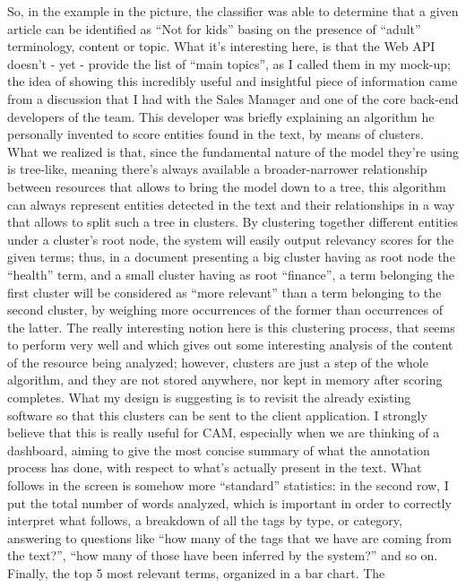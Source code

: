 \documentclass[12pt,svgnames]{memoir}
\begin{document}
So, in the example in the picture, the classifier was able to determine
that a given article can be identified as ``Not for kids'' basing on the
presence of ``adult'' terminology, content or topic. What it's
interesting here, is that the Web API doesn't - yet - provide the list
of ``main topics'', as I called them in my mock-up; the idea of showing
this incredibly useful and insightful piece of information came from a
discussion that I had with the Sales Manager and one of the core
back-end developers of the team. This developer was briefly explaining
an algorithm he personally invented to score entities found in the text,
by means of clusters. What we realized is that, since the fundamental
nature of the model they're using is tree-like, meaning there's always
available a broader-narrower relationship between resources that allows
to bring the model down to a tree, this algorithm can always represent
entities detected in the text and their relationships in a way that
allows to split such a tree in clusters. By clustering together
different entities under a cluster's root node, the system will easily
output relevancy scores for the given terms; thus, in a document
presenting a big cluster having as root node the ``health'' term, and a
small cluster having as root ``finance'', a term belonging the first
cluster will be considered as ``more relevant'' than a term belonging to
the second cluster, by weighing more occurrences of the former than
occurrences of the latter. The really interesting notion here is this
clustering process, that seems to perform very well and which gives out
some interesting analysis of the content of the resource being analyzed;
however, clusters are just a step of the whole algorithm, and they are
not stored anywhere, nor kept in memory after scoring completes. What my
design is suggesting is to revisit the already existing software so that
this clusters can be sent to the client application. I strongly believe
that this is really useful for CAM, especially when we are thinking of a
dashboard, aiming to give the most concise summary of what the
annotation process has done, with respect to what's actually present in
the text. What follows in the screen is somehow more ``standard''
statistics: in the second row, I put the total number of words analyzed,
which is important in order to correctly interpret what follows, a
breakdown of all the tags by type, or category, answering to questions
like ``how many of the tags that we have are coming from the text?'',
``how many of those have been inferred by the system?'' and so on.
Finally, the top 5 most relevant terms, organized in a bar chart. The
\end{document}
